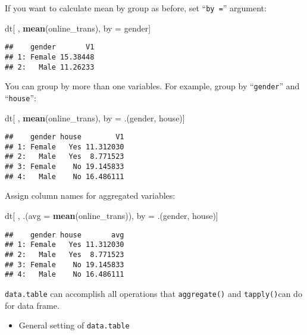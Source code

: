 \documentclass[
]{article}
\newenvironment{Shaded}{\begin{snugshade}}{\end{snugshade}}
\newcommand{\DataTypeTok}[1]{\textcolor[rgb]{0.13,0.29,0.53}{#1}}
\newcommand{\KeywordTok}[1]{\textcolor[rgb]{0.13,0.29,0.53}{\textbf{#1}}}
\newcommand{\NormalTok}[1]{#1}
\newcommand{\StringTok}[1]{\textcolor[rgb]{0.31,0.60,0.02}{#1}}
\providecommand{\tightlist}{%
  \setlength{\itemsep}{0pt}\setlength{\parskip}{0pt}}
\begin{document}
If you want to calculate mean by group as before, set ``\texttt{by\ =}''
argument:

\begin{Shaded}
\begin{Highlighting}[]
\NormalTok{dt[ , }\KeywordTok{mean}\NormalTok{(online_trans), by =}\StringTok{ }\NormalTok{gender]}
\end{Highlighting}
\end{Shaded}

\begin{verbatim}
##    gender       V1
## 1: Female 15.38448
## 2:   Male 11.26233
\end{verbatim}

You can group by more than one variables. For example, group by
``\texttt{gender}'' and ``\texttt{house}'':

\begin{Shaded}
\begin{Highlighting}[]
\NormalTok{dt[ , }\KeywordTok{mean}\NormalTok{(online_trans), by =}\StringTok{ }\NormalTok{.(gender, house)]}
\end{Highlighting}
\end{Shaded}

\begin{verbatim}
##    gender house        V1
## 1: Female   Yes 11.312030
## 2:   Male   Yes  8.771523
## 3: Female    No 19.145833
## 4:   Male    No 16.486111
\end{verbatim}

Assign column names for aggregated variables:

\begin{Shaded}
\begin{Highlighting}[]
\NormalTok{dt[ , .(}\DataTypeTok{avg =} \KeywordTok{mean}\NormalTok{(online_trans)), by =}\StringTok{ }\NormalTok{.(gender, house)]}
\end{Highlighting}
\end{Shaded}

\begin{verbatim}
##    gender house       avg
## 1: Female   Yes 11.312030
## 2:   Male   Yes  8.771523
## 3: Female    No 19.145833
## 4:   Male    No 16.486111
\end{verbatim}

\texttt{data.table} can accomplish all operations that
\texttt{aggregate()} and \texttt{tapply()}can do for data frame.

\begin{itemize}
\tightlist
\item
  General setting of \texttt{data.table}
\end{itemize}
\end{document}
